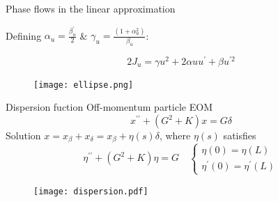\documentclass[aspectratio=169]{beamer}
\begin{document}
\begin{frame}{Phase flows in the linear approximation}
    \begin{minipage}{0.45\textwidth}
        Defining $\alpha_u = \frac{\beta_u^\prime}{2}$  \& $\gamma_u = \frac{(1+\alpha_u^2)}{\beta_u}$:

        $$2J_u=\gamma u^{2}+2\alpha u u^{\prime}+\beta u^{\prime2}$$
    \end{minipage}
    \hfill
    \pause
    \begin{minipage}{0.45\textwidth}
        \begin{figure}
        \centering
        \texttt{[image: ellipse.png]}
        \end{figure}{}
    \end{minipage}
\end{frame}
\begin{frame}{Dispersion fuction}
    Off-momentum particle EOM
    \begin{equation*}
        x^{\prime\prime}+(G^2+K)x=G\delta
    \end{equation*}
    \pause
    Solution $x=x_\beta+ x_\delta = x_\beta+ \eta(s)\delta $, \pause where $\eta(s)$ satisfies
    \begin{equation*}
        \eta^{\prime\prime}+(G^2+K)\eta=G\quad
        \begin{cases}
            \eta(0) = \eta(L)\\
            \eta^\prime(0) = \eta^\prime(L)
        \end{cases}
    \end{equation*}
    \pause
    \begin{figure}
        \centering
        \texttt{[image: dispersion.pdf]}
    \end{figure}
\end{frame}
\end{document}
